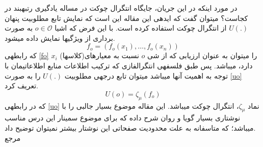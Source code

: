 \documentclass[10pt,a4paper]{article}
\newcommand{\نیمفاصله}{\halfspace}
\renewcommand{\ }{\halfspace}
\newcommand{\renderref}[1] { \begingroup \let\clearpage\relax  \endgroup }
\renewcommand{\O}{\mathscr{O}}
\begin{document}
در مورد اینکه در این جریان، جایگاه انتگرال چوکت در مساله یادگیری رتبه\ بند در کجاست؟ می\ توان گفت که ایده\ ی این مقاله این است که نمایش تابع مطلوبیت پنهان
$U(.)$
از انتگرال چوکت استفاده کرده است. با این فرض که اشیا
$o \in \O$
به صورت برداری از ویژگی\ ها نمایش داده می\ شود.
\begin{equation}
f_o = (f_o(x_1), \ldots, f_o(x_n))
\label{fo}
\end{equation}
که رابطه\ ی
\ref{fo}
را می\ توان به عنوان ارزیابی که از شی $o$ نسبت به معیارهای(کلاس\ ها) $x_i$ دارد، می\ باشد. پس طبق فلسفه\ ی انتگرال\ فازی که ترکیب اطلاعات منابع اطلاعاتی\ مان با توجه به اهمیت آنها می\ باشد می\ توان تابع درجه\ ی مطلوبیت $U(.)$ را به صورت
\ref{uo}
تعریف کرد.
\begin{equation}
U(o) =  \zeta_\mu(f_o)
\label{uo}
\end{equation}
که در رابطه\ ی
\ref{uo}
نماد
$\zeta_\mu$،
انتگرال چوکت می\ باشد.
این مقاله\
\cite{THEPAPER}
موضوع بسیار جالبی را با نوشتاری بسیار گویا و روان شرح داده که برای موضوع سمینار این درس مناسب می\ باشد؛ که متاسفانه به علت محدودیت صفحاتی این نوشتار بیشتر نمی\ توان توضیح داد.
\vspace{10pt}\\
{\LARGE مرجع}
\nocite{*}
\renderref{reference}
\end{document}
